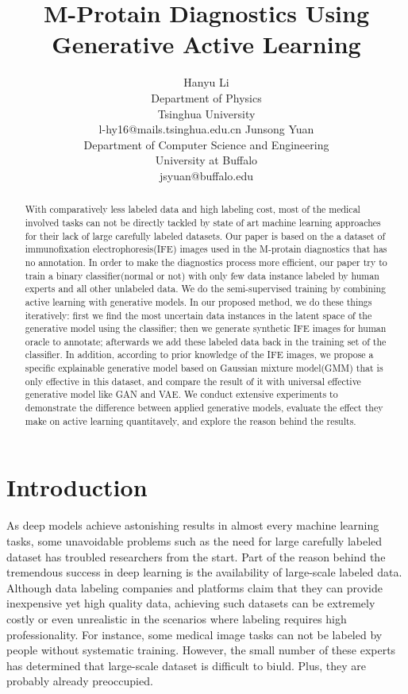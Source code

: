 \documentclass[letterpaper]{article}
\title{M-Protain Diagnostics Using Generative Active Learning}
\author{Hanyu Li\\
Department of Physics\\
Tsinghua University\\
l-hy16@mails.tsinghua.edu.cn
\And
Junsong Yuan\\
Department of Computer Science and Engineering\\
University at Buffalo\\
jsyuan@buffalo.edu}
\author{}
\begin{document}
\maketitle


\begin{abstract}
    With comparatively less labeled data and high labeling cost, most of the medical involved tasks can not be directly tackled by state of art machine learning approaches for their lack of large carefully labeled datasets. Our paper is based on the a dataset of immunofixation electrophoresis(IFE) images used in the M-protain diagnostics that has no annotation. In order to make the diagnostics process more efficient, our paper try to train a binary classifier(normal or not) with only few data instance labeled by human experts and all other unlabeled data. We do the semi-supervised training by combining active learning with generative models. In our proposed method, we do these things iteratively: first we find the most uncertain data instances in the latent space of the generative model using the classifier; then we generate synthetic IFE images for human oracle to annotate; afterwards we add these labeled data back in the training set of the classifier. In addition, according to prior knowledge of the IFE images, we propose a specific explainable generative model based on Gaussian mixture model(GMM) that is only effective in this dataset, and compare the result of it with universal effective generative model like GAN and VAE. We conduct extensive experiments to demonstrate the difference between applied generative models, evaluate the effect they make on active learning quantitavely, and explore the reason behind the results.
\end{abstract}


\section{Introduction}
\par As deep models achieve astonishing results in almost every machine learning tasks, some unavoidable problems such as the need for large carefully labeled dataset has troubled researchers from the start. Part of the reason behind the tremendous success in deep learning is the availability of large-scale labeled data\cite{sun2017revisiting}. Although data labeling companies and platforms claim that they can provide inexpensive yet high quality data\cite{buhrmester2011amazon}, achieving such datasets can be extremely costly or even unrealistic in the scenarios where labeling requires high professionality. For instance, some medical image tasks can not be labeled by people without systematic training. However, the small number of these experts has determined that large-scale dataset is difficult to biuld. Plus, they are probably already preoccupied.
\end{document}
